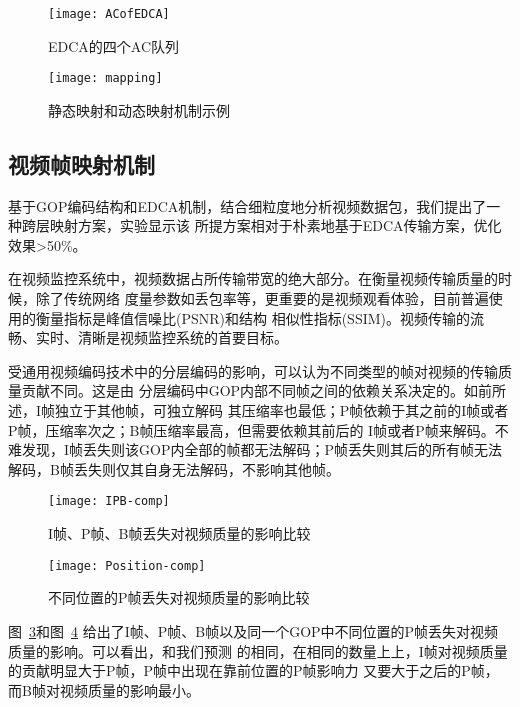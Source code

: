 \begin{figure}[H] %
  \centering
  \texttt{[image: ACofEDCA]}
  \caption{EDCA的四个AC队列}
  \label{fig:acofedca}
\end{figure}
\begin{figure}[H] %
  \centering
  \texttt{[image: mapping]}
  \caption{静态映射和动态映射机制示例}
  \label{fig:originmapping}
\end{figure}

\subsection{视频帧映射机制}
基于GOP编码结构和EDCA机制，结合细粒度地分析视频数据包，我们提出了一种跨层映射方案，实验显示该
所提方案相对于朴素地基于EDCA传输方案，优化效果>50\%。

在视频监控系统中，视频数据占所传输带宽的绝大部分。在衡量视频传输质量的时候，除了传统网络
度量参数如丢包率等，更重要的是视频观看体验，目前普遍使用的衡量指标是峰值信噪比(PSNR)和结构
相似性指标(SSIM)。视频传输的流畅、实时、清晰是视频监控系统的首要目标。

受通用视频编码技术中的分层编码的影响，可以认为不同类型的帧对视频的传输质量贡献不同。这是由
分层编码中GOP内部不同帧之间的依赖关系决定的。如前所述，I帧独立于其他帧，可独立解码
其压缩率也最低；P帧依赖于其之前的I帧或者P帧，压缩率次之；B帧压缩率最高，但需要依赖其前后的
I帧或者P帧来解码。不难发现，I帧丢失则该GOP内全部的帧都无法解码；P帧丢失则其后的所有帧无法
解码，B帧丢失则仅其自身无法解码，不影响其他帧。

\begin{figure}[H] %
  \centering
  \texttt{[image: IPB-comp]}
  \caption{I帧、P帧、B帧丢失对视频质量的影响比较}
  \label{fig:ipb-comp}
\end{figure}
\begin{figure}[H] %
  \centering
  \texttt{[image: Position-comp]}
  \caption{不同位置的P帧丢失对视频质量的影响比较}
  \label{fig:position-comp}
\end{figure}

图~\ref{fig:ipb-comp}和图~\ref{fig:position-comp}
给出了I帧、P帧、B帧以及同一个GOP中不同位置的P帧丢失对视频质量的影响。可以看出，和我们预测
的相同，在相同的数量上上，I帧对视频质量的贡献明显大于P帧，P帧中出现在靠前位置的P帧影响力
又要大于之后的P帧，而B帧对视频质量的影响最小。


